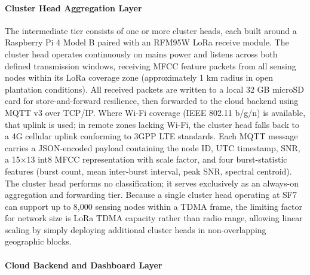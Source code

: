 \documentclass[12pt,a4paper,oneside]{memoir}
\begin{document}
\paragraph{Cluster Head Aggregation Layer}

The intermediate tier consists of one or more cluster heads, each built around a Raspberry Pi 4 Model B paired with an RFM95W LoRa receive module. The cluster head operates continuously on mains power and listens across both defined transmission windows, receiving MFCC feature packets from all sensing nodes within its LoRa coverage zone (approximately 1 km radius in open plantation conditions). All received packets are written to a local 32 GB microSD card for store-and-forward resilience, then forwarded to the cloud backend using MQTT v3 over TCP/IP. Where Wi-Fi coverage (IEEE 802.11 b/g/n) is available, that uplink is used; in remote zones lacking Wi-Fi, the cluster head falls back to a 4G cellular uplink conforming to 3GPP LTE standards. Each MQTT message carries a JSON-encoded payload containing the node ID, UTC timestamp, SNR, a 15×13 int8 MFCC representation with scale factor, and four burst-statistic features (burst count, mean inter-burst interval, peak SNR, spectral centroid). The cluster head performs no classification; it serves exclusively as an always-on aggregation and forwarding tier. Because a single cluster head operating at SF7 can support up to 8,000 sensing nodes within a TDMA frame, the limiting factor for network size is LoRa TDMA capacity rather than radio range, allowing linear scaling by simply deploying additional cluster heads in non-overlapping geographic blocks.

\paragraph{Cloud Backend and Dashboard Layer}
\end{document}
